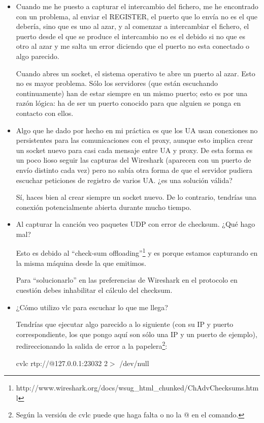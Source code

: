 \documentclass[a4paper,11pt]{article}
\begin{document}
\begin{itemize}
\item Cuando me he puesto a capturar el intercambio del fichero, me he encontrado con un problema, al enviar el REGISTER, el puerto que lo envía no es el que debería, sino que es uno al azar, y al comenzar a intercambiar el fichero, el puerto desde el que se produce el intercambio no es el debido si no que es otro al azar y me salta un error diciendo que el puerto no esta conectado o algo parecido.

Cuando abres un socket, el sistema operativo te abre un puerto al azar. Esto no es mayor problema. Sólo los servidores (que están escuchando continuamente) han de estar siempre en un mismo puerto; esto es por una razón lógica: ha de ser un puerto conocido para que alguien se ponga en contacto con ellos.

\item Algo que he dado por hecho en mi práctica es que los UA usan conexiones no persistentes para las comunicaciones con el proxy, aunque esto implica crear un socket nuevo para casi cada mensaje entre UA y proxy. De esta forma es un poco lioso seguir las capturas del Wireshark (aparecen con un puerto de envío distinto cada vez) pero no sabía otra forma de que el servidor pudiera escuchar peticiones de registro de varios UA. ¿es una solución válida?

Sí, haces bien al crear siempre un socket nuevo. De lo contrario, tendrías una conexión potencialmente abierta durante mucho tiempo.

\item Al capturar la canción veo paquetes UDP con error de checksum. ¿Qué hago mal?

Esto es debido al ``check-sum offloading''\footnote{http://www.wireshark.org/docs/wsug\_html\_chunked/ChAdvChecksums.html} y es porque estamos capturando en la misma máquina desde la que emitimos.

Para ``solucionarlo'' en las preferencias de Wireshark en el protocolo en cuestión debes inhabilitar el cálculo del checksum.

\item ¿Cómo utilizo vlc para escuchar lo que me llega?

Tendrías que ejecutar algo parecido a lo siguiente (con su IP y puerto correspondiente, los que pongo aquí son sólo una IP y un puerto de ejemplo), redireccionando la salida de error a la papelera\footnote{Según la versión de cvlc puede que haga falta o no la @ en el comando.}:

cvlc rtp://@127.0.0.1:23032 2$>$ /dev/null

\end{itemize}
\end{document}
